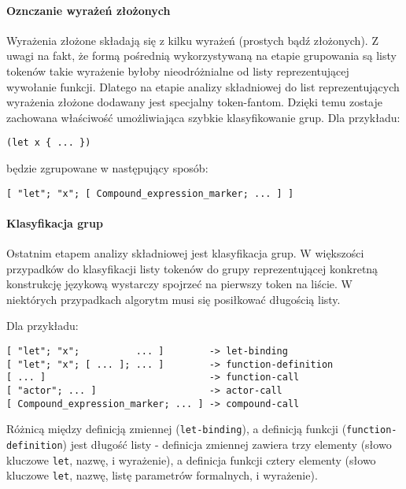 \paragraph{Oznczanie wyrażeń złożonych}

Wyrażenia złożone składają się z kilku wyrażeń (prostych bądź złożonych). Z uwagi na fakt, że formą pośrednią
wykorzystywaną na etapie grupowania są listy tokenów takie wyrażenie byłoby nieodróżnialne od listy
reprezentującej wywołanie funkcji. Dlatego na etapie analizy składniowej do list reprezentujących wyrażenia
złożone dodawany jest specjalny token-fantom. Dzięki temu zostaje zachowana właściwość umożliwiająca szybkie
klasyfikowanie grup. Dla przykładu:

\begin{lstlisting}
(let x { ... })
\end{lstlisting}

będzie zgrupowane w następujący sposób:

\begin{lstlisting}
[ "let"; "x"; [ Compound_expression_marker; ... ] ]
\end{lstlisting}

\paragraph{Klasyfikacja grup}

Ostatnim etapem analizy składniowej jest klasyfikacja grup. W większości przypadków do klasyfikacji listy
tokenów do grupy reprezentującej konkretną konstrukcję językową wystarczy spojrzeć na pierwszy token na
liście. W niektórych przypadkach algorytm musi się posiłkować długością listy.

Dla przykładu:

\begin{lstlisting}
[ "let"; "x";          ... ]        -> let-binding
[ "let"; "x"; [ ... ]; ... ]        -> function-definition
[ ... ]                             -> function-call
[ "actor"; ... ]                    -> actor-call
[ Compound_expression_marker; ... ] -> compound-call
\end{lstlisting}

Różnicą między definicją zmiennej (\texttt{let-binding}), a definicją funkcji (\texttt{function-definition})
jest długość listy - definicja zmiennej zawiera trzy elementy (słowo kluczowe \texttt{let}, nazwę, i
wyrażenie), a definicja funkcji cztery elementy (słowo kluczowe \texttt{let}, nazwę, listę parametrów
formalnych, i wyrażenie).

